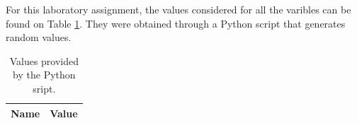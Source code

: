 
\vspace{1cm}

For this laboratory assignment, the values considered for all the varibles can be
found on Table \ref{tab:given_vls}. They were obtained through a Python script that
generates random values. 

\begin{table}[h]
	\centering
	\begin{tabular}{|l|r|}
		\hline    
		{\bf Name} & {\bf Value} \\ \hline
    		
	\end{tabular}
	
	\caption{Values provided by the Python sript.}
    
\label{tab:given_vls}
\end{table}

